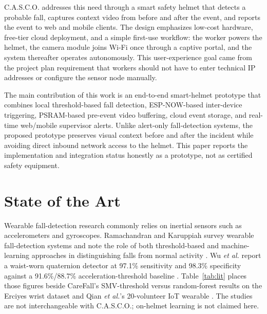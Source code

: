 \documentclass[conference]{IEEEtran}
\begin{document}
C.A.S.C.O. addresses this need through a smart safety helmet that detects a probable fall, captures context video from before and after the event, and reports the event to web and mobile clients. The design emphasizes low-cost hardware, free-tier cloud deployment, and a simple first-use workflow: the worker powers the helmet, the camera module joins Wi-Fi once through a captive portal, and the system thereafter operates autonomously. This user-experience goal came from the project plan requirement that workers should not have to enter technical IP addresses or configure the sensor node manually.

The main contribution of this work is an end-to-end smart-helmet prototype that combines local threshold-based fall detection, ESP-NOW-based inter-device triggering, PSRAM-based pre-event video buffering, cloud event storage, and real-time web/mobile supervisor alerts. Unlike alert-only fall-detection systems, the proposed prototype preserves visual context before and after the incident while avoiding direct inbound network access to the helmet. This paper reports the implementation and integration status honestly as a prototype, not as certified safety equipment.

\section{State of the Art}
\IEEEpubidadjcol
Wearable fall-detection research commonly relies on inertial sensors such as accelerometers and gyroscopes. Ramachandran and Karuppiah survey wearable fall-detection systems and note the role of both threshold-based and machine-learning approaches in distinguishing falls from normal activity \cite{ramachandran2020}. Wu \textit{et al.} report a waist-worn quaternion detector at 97.1\% sensitivity and 98.3\% specificity against a 91.6\%/88.7\% acceleration-threshold baseline \cite{wu2015}. Table~\ref{tab:lit} places those figures beside CareFall's SMV-threshold versus random-forest results on the Erciyes wrist dataset \cite{ruizgarcia2023} and Qian \textit{et al.}'s 20-volunteer IoT wearable \cite{qian2022}. The studies are not interchangeable with C.A.S.C.O.; on-helmet learning is not claimed here.
\end{document}
